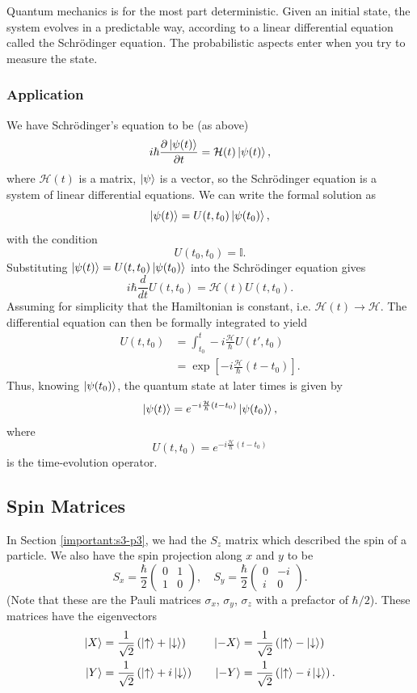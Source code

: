 \documentclass{article}
\begin{document}
Quantum mechanics is for the most part deterministic. Given an initial state, the system evolves in a predictable way, according to a linear differential equation called the Schr\"odinger equation. The probabilistic aspects enter when you try to measure the state.

\subsubsection{Application}
We have Schr\"odinger's equation to be (as above)
\[
    i \hbar \frac{\partial \ket{\psi (t)}}{\partial t} = \mathcal{H}(t)\ket{\psi (t)},
\]
where $\mathcal{H}(t)$ is a matrix, $\ket{\psi }$ is a vector, so the Schr\"odinger equation is a system of linear differential equations. We can write the formal solution as
\[
    \ket{\psi (t)}=U(t,t_0)\ket{\psi (t_0)},
\]
with the condition
\[
    U(t_0,t_0)=\mathbb{I}.
\]
Substituting $\ket{\psi (t)}=U(t,t_0)\ket{\psi (t_0)}$ into the Schr\"odinger equation gives
\[
    i \hbar \frac{d }{d t}U(t,t_0)=\mathcal{H}(t)U(t,t_0).
\]
Assuming for simplicity that the Hamiltonian is constant, i.e. $\mathcal{H}(t)\to \mathcal{H}$. The differential equation can then be formally integrated to yield
\begin{align*}
    U(t,t_0) &= \int_{t_0}^t-i \frac{\mathcal{H}}{\hbar}U(t',t_0) \\
             &=\exp \left[ -i \frac{\mathcal{H}}{\hbar}(t-t_0) \right].
\end{align*}
Thus, knowing $\ket{\psi (t_0)}$, the quantum state at later times is given by
\[
    \ket{\psi (t)}=e^{-i \frac{\mathcal{H}}{\hbar}(t-t_0)}\ket{\psi (t_0)},
\]
where
\[
    \boxed{U(t,t_0)=e^{-i \frac{\mathcal{H}}{\hbar}(t-t_0)}}
\]
is the time-evolution operator.

\subsection{Spin Matrices}
In Section \ref{important:s3-p3}, we had the $S_z$ matrix which described the spin of a particle. We also have the spin projection along $x$ and $y$ to be
\[
    S_x=\frac{\hbar }{2}\begin{pmatrix}
        0 & 1 \\ 1 & 0
    \end{pmatrix},\quad S_y=\frac{\hbar }{2}\begin{pmatrix}
        0 & -i \\ i & 0
    \end{pmatrix}.
\]
(Note that these are the Pauli matrices $\sigma _x$, $\sigma _y$, $\sigma _z$ with a prefactor of $\hbar /2$). These matrices have the eigenvectors
\begin{align*}
    \ket{X} &= \frac{1}{\sqrt{2}} \left( \ket{\uparrow}+\ket{\downarrow} \right)&\quad \ket{-X}&=\frac{1}{\sqrt{2}}\left( \ket{\uparrow}-\ket{\downarrow} \right) \\
    \ket{Y}&=\frac{1}{\sqrt{2}}\left( \ket{\uparrow}+i \ket{\downarrow} \right)&\quad \ket{-Y}&=\frac{1}{\sqrt{2}}\left( \ket{\uparrow}-i \ket{\downarrow} \right).
\end{align*}
\end{document}
